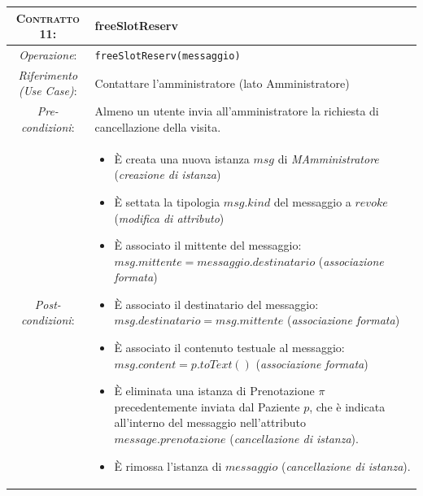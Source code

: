 \begin{tabularx}{\columnwidth}{cX}
\toprule
\textsc{Contratto 11}: & 	\textbf{freeSlotReserv}\\
\midrule
\textit{Operazione}: & 		\texttt{freeSlotReserv(messaggio)}\\
\textit{Riferimento (Use Case)}: &	Contattare l'amministratore (lato Amministratore)\\
\textit{Pre-condizioni}: &  	Almeno un utente invia all'amministratore la
				richiesta di cancellazione della visita.\\
\textit{Post-condizioni}: & 	\begin{itemize}
\item È creata una nuova istanza $msg$ di \textit{MAmministratore} (\textit{creazione di istanza})
\item È settata la tipologia $msg.kind$ del messaggio a $revoke$ (\textit{modifica di attributo})
\item È associato il mittente del messaggio: $msg.mittente = 
	messaggio.destinatario$ (\textit{associazione formata})
\item È associato il destinatario del messaggio: $msg.destinatario 
	= msg.mittente$ (\textit{associazione formata})
\item È associato il contenuto testuale al messaggio: $msg.content = p.toText()$
	(\textit{associazione formata})
\item È eliminata una istanza di Prenotazione $\pi$ precedentemente inviata dal 
	Paziente $p$, che è indicata all'interno del messaggio nell'attributo
	$message.prenotazione$ (\textit{cancellazione di istanza}).
\item È rimossa l'istanza di $messaggio$ (\textit{cancellazione di istanza}). 
\end{itemize}\\
\bottomrule
\end{tabularx}
\medskip




